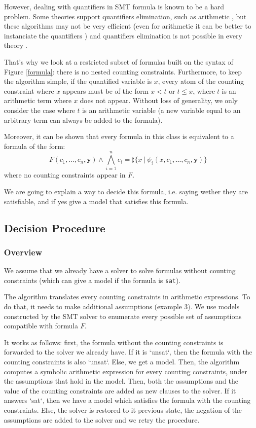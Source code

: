 \documentclass[]{article}
\begin{document}
However, dealing with quantifiers in SMT formula is known to be a hard problem. Some theories
support quantifiers elimination, such as arithmetic \cite{cooper}, but these algorithms may not be very
efficient (even for arithmetic it can be better to instanciate the quantifiers \cite{dutertre2015solving}) and quantifiers elimination is not possible in every theory \cite{bradley2006s}.

That's why we look at a restricted subset of formulas built on the syntax of Figure \ref{formula}:
there is no nested counting constraints. Furthermore, to keep the algorithm simple, if the
quantified variable is $x$, every atom of the counting constraint where $x$ appears must be of the form $x < t$ or $t \le x$,
where $t$ is an arithmetic term where $x$ does not appear. Without loss of generality, we only
consider the case where $t$  is an arithmetic variable (a new variable equal to an arbitrary term
can always be added to the formula).

Moreover, it can be shown that every formula in this class is equivalent to a formula of the form:
\begin{equation}
F(c_1, \ldots, c_n, \mathbf{y}) \land \bigwedge\limits_{i=1}^n c_i = \sharp\{ x \ |\ \psi_i(x, c_1, \ldots, c_n,
\mathbf{y})\}
\label{maingoal}
\end{equation}
where no counting constraints appear in $F$.

We are going to explain a way to decide this formula, i.e. saying wether
they are satisfiable, and if yes give a model that satisfies this
formula.

\subsection{Decision Procedure}
\subsubsection{Overview}

We assume that we already have a solver to solve formulas without
counting constraints (which can give a model if the formula is
\texttt{sat}).

The algorithm translates every counting constraints in arithmetic expressions. To do that, it needs
to make additional assumptions (example 3). We use models constructed by the SMT solver to enumerate every possible set of
assumptions compatible with formula $F$.

It works as follows: first, the formula without the counting constraints is forwarded to
the solver we already have. If it is `unsat`, then the formula with the counting constraints is also
`unsat`. Else, we get a model. Then, the algorithm computes a symbolic arithmetic expression for every counting
constraints, under the assumptions that hold in the model. Then, both the assumptions and the value
of the counting constraints are added as new clauses to the solver. If it answers `sat`, then we
have a model which satisfies the formula with the counting constraints. Else, the solver is
restored to it previous state, the negation of the assumptions are added to the solver and we
retry the procedure.
\end{document}
